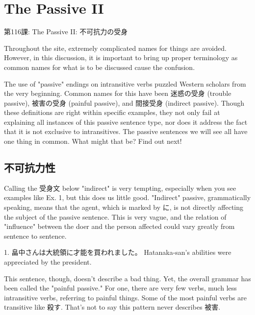     
\chapter{The Passive II}

\begin{center}
\begin{Large}
第116課: The Passive II: 不可抗力の受身 
\end{Large}
\end{center}
 
\par{ Throughout the site, extremely complicated names for things are avoided. However, in this discussion, it is important to bring up proper terminology as common names for what is to be discussed cause the confusion. }

\par{ The use of "passive" endings on intransitive verbs puzzled Western scholars from the very beginning. Common names for this have been 迷惑の受身 (trouble passive), 被害の受身 (painful passive), and 間接受身 (indirect passive). Though these definitions are right within specific examples, they not only fail at explaining all instances of this passive sentence type, nor does it address the fact that it is not exclusive to intransitives. The passive sentences we will see all have one thing in common. What might that be? Find out next! }
      
\section{不可抗力性}
 
\par{ Calling the 受身文 below "indirect" is very tempting, especially when you see examples like Ex. 1, but this does us little good. "Indirect" passive, grammatically speaking, means that the agent, which is marked by に, is not directly affecting the subject of the passive sentence. This is very vague, and the relation of "influence" between the doer and the person affected could vary greatly from sentence to sentence. }

\par{1. 畠中さんは大統領に才能を買われました。 \hfill\break
Hatanaka-san's abilities were appreciated by the president. }

\par{ This sentence, though, doesn't describe a bad thing. Yet, the overall grammar has been called the "painful passive." For one, there are very few verbs, much less intransitive verbs, referring to painful things. Some of the most painful verbs are transitive like 殺す. That's not to say this pattern never describes 被害. }

